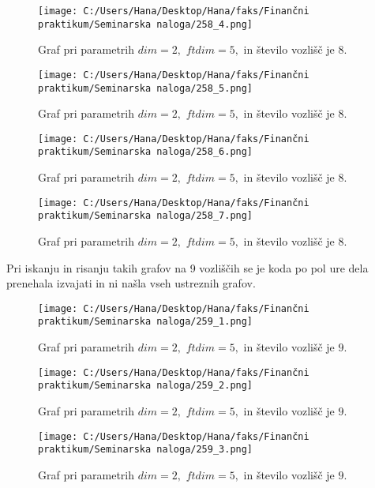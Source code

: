\documentclass[12pt]{article}
\begin{document}
\begin{figure}[H]
    \centering
    \texttt{[image: C:/Users/Hana/Desktop/Hana/faks/Finančni praktikum/Seminarska naloga/258\_4.png]}
    \caption{Graf pri parametrih $dim = 2,$ $ftdim = 5,$ in število vozlišč je $8.$}
    \label{fig:slika258_4}
\end{figure}

\begin{figure}[H]
    \centering
    \texttt{[image: C:/Users/Hana/Desktop/Hana/faks/Finančni praktikum/Seminarska naloga/258\_5.png]}
    \caption{Graf pri parametrih $dim = 2,$ $ftdim = 5,$ in število vozlišč je $8.$}
    \label{fig:slika258_5}
\end{figure}

\begin{figure}[H]
    \centering
    \texttt{[image: C:/Users/Hana/Desktop/Hana/faks/Finančni praktikum/Seminarska naloga/258\_6.png]}
    \caption{Graf pri parametrih $dim = 2,$ $ftdim = 5,$ in število vozlišč je $8.$}
    \label{fig:slika258_6}
\end{figure}

\begin{figure}[H]
    \centering
    \texttt{[image: C:/Users/Hana/Desktop/Hana/faks/Finančni praktikum/Seminarska naloga/258\_7.png]}
    \caption{Graf pri parametrih $dim = 2,$ $ftdim = 5,$ in število vozlišč je $8.$}
    \label{fig:slika258_7}
\end{figure}

Pri iskanju in risanju takih grafov na 9 vozliščih se je koda po pol ure dela prenehala izvajati in ni našla vseh ustreznih 
grafov. 

\begin{figure}[H]
    \centering
    \texttt{[image: C:/Users/Hana/Desktop/Hana/faks/Finančni praktikum/Seminarska naloga/259\_1.png]}
    \caption{Graf pri parametrih $dim = 2,$ $ftdim = 5,$ in število vozlišč je $9.$}
    \label{fig:slika259_1}
\end{figure}

\begin{figure}[H]
    \centering
    \texttt{[image: C:/Users/Hana/Desktop/Hana/faks/Finančni praktikum/Seminarska naloga/259\_2.png]}
    \caption{Graf pri parametrih $dim = 2,$ $ftdim = 5,$ in število vozlišč je $9.$}
    \label{fig:slika259_2}
\end{figure}

\begin{figure}[H]
    \centering
    \texttt{[image: C:/Users/Hana/Desktop/Hana/faks/Finančni praktikum/Seminarska naloga/259\_3.png]}
    \caption{Graf pri parametrih $dim = 2,$ $ftdim = 5,$ in število vozlišč je $9.$}
    \label{fig:slika259_3}
\end{figure}
\end{document}
